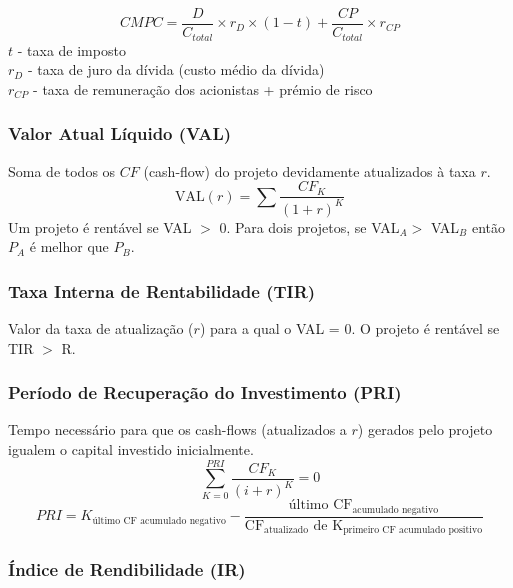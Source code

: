 \documentclass[11pt]{article}
\begin{document}
\begin{equation*}
    CMPC =
    \frac{D}{C_{total}}\times r_D\times(1-t)+\frac{CP}{C_{total}}\times r_{CP}
\end{equation*}
$t$ - taxa de imposto \\
$r_D$ - taxa de juro da dívida (custo médio da dívida) \\
$r_{CP}$ - taxa de remuneração dos acionistas + prémio de risco

\subsubsection{Valor Atual Líquido (VAL)}

Soma de todos os $CF$ (cash-flow) do projeto devidamente atualizados à taxa $r$.
\begin{equation*}
    \text{VAL}(r) = \sum \frac{CF_K}{(1+r)^K}
\end{equation*}
Um projeto é rentável se VAL $>$ 0.
Para dois projetos, se VAL$_A >$ VAL$_B$ então $P_A$ é melhor que $P_B$.

\subsubsection{Taxa Interna de Rentabilidade (TIR)}

Valor da taxa de atualização ($r$) para a qual o VAL = 0. O projeto é rentável se TIR $>$ R.

\subsubsection{Período de Recuperação do Investimento (PRI)}

Tempo necessário para que os cash-flows (atualizados a $r$) gerados pelo projeto igualem o capital investido inicialmente.
\begin{equation*}
    \sum_{K=0}^{PRI} \frac{CF_K}{(i+r)^K}=0
\end{equation*}
\begin{equation*}
    PRI = K_{\text{último CF acumulado negativo}} - \frac{\text{último CF}_{\text{acumulado negativo}}}{\text{CF}_{\text{atualizado}}\text{ de K}_{\text{primeiro CF acumulado positivo}}}
\end{equation*}

\subsubsection{Índice de Rendibilidade (IR)}
\end{document}
